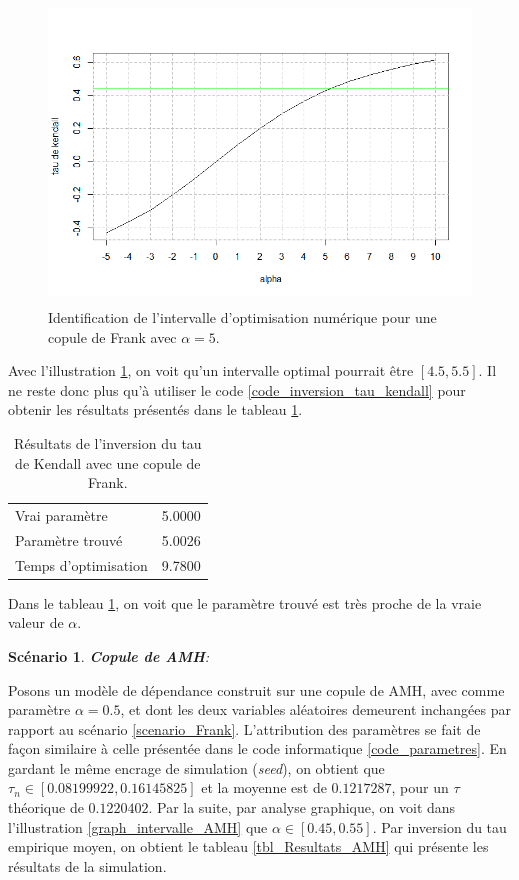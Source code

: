 \documentclass{article}
\newtheorem{scenario}{Scénario}
\begin{document}
	\begin{figure}[H]
		\centering
		\includegraphics[height=8cm]{Graph/intevalle_frank.png}
		\caption[Identification de l'intervalle d'optimisation numérique pour le scénario \ref{scenario_Frank}]
		{Identification de l'intervalle d'optimisation numérique pour une copule de Frank avec $\alpha = 5$.} 
		\label{graph_intervalle_Frank}
	\end{figure}

	Avec l'illustration \ref{graph_intervalle_Frank}, on voit qu'un intervalle optimal pourrait être $[4.5, 5.5]$. Il ne reste donc plus qu'à utiliser le code \ref{code_inversion_tau_kendall} pour obtenir les résultats présentés dans le tableau \ref{tbl_Resultats_Frank}.
	
	\begin{table}[H]
		\centering
		\begin{tabular}{lr}
			\hline
			Vrai paramètre & 5.0000 \\ 
			Paramètre trouvé & 5.0026 \\ 
			Temps d'optimisation & 9.7800 \\ 
			\hline
		\end{tabular}
	\caption{Résultats de l'inversion du tau de Kendall avec une copule de Frank.}
	\label{tbl_Resultats_Frank}
	\end{table}

	Dans le tableau \ref{tbl_Resultats_Frank}, on voit que le paramètre trouvé est très proche de la vraie valeur de $\alpha$. 
	
 	
 	\begin{scenario}
 		\textbf{Copule de AMH}:
 		\label{scenario_AMH}
 	\end{scenario}
 	 Posons un modèle de dépendance construit sur une copule de AMH, avec comme paramètre $\alpha = 0.5$, et dont les deux variables aléatoires demeurent inchangées par rapport au scénario \ref{scenario_Frank}. 
 	 L'attribution des paramètres se fait de façon similaire à celle présentée dans le code informatique \ref{code_parametres}. En gardant le même encrage de simulation (\textit{seed}), on obtient que $\tau_n \in [0.08199922, 0.16145825]$ et la moyenne est de $0.1217287$, pour un $\tau$ théorique de $0.1220402$. Par la suite, par analyse graphique, on voit dans l'illustration \ref{graph_intervalle_AMH} que $\alpha \in [0.45, 0.55]$. Par inversion du tau empirique moyen, on obtient le tableau \ref{tbl_Resultats_AMH} qui présente les résultats de la simulation.\\
 	 
\end{document}

